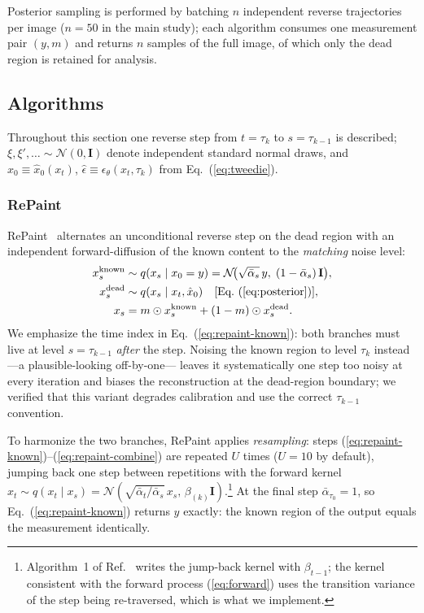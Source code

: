 Posterior sampling is performed by batching $n$ independent reverse
trajectories per image ($n = 50$ in the main study); each algorithm
consumes one measurement pair $(y, m)$ and returns $n$ samples of the
full image, of which only the dead region is retained for analysis.

\subsection{Algorithms}
\label{sec:inpainting:algorithms}

Throughout this section one reverse step from $t = \tau_k$ to
$s = \tau_{k-1}$ is described; $\xi, \xi', \dots \sim \mathcal{N}(0,
\mathbf{I})$ denote independent standard normal draws, and
$\hat x_0 \equiv \hat x_0(x_t)$, $\hat\epsilon \equiv
\epsilon_\theta(x_t, \tau_k)$ from Eq.~(\ref{eq:tweedie}).

\subsubsection{RePaint}
\label{sec:inpainting:repaint}

RePaint~\cite{lugmayr2022repaint} alternates an unconditional reverse
step on the dead region with an independent forward-diffusion of the
known content to the \emph{matching} noise level:
\begin{align}
  x_s^{\mathrm{known}} &\sim
      q(x_s \mid x_0 = y)
      = \mathcal{N}\!\bigl(\sqrt{\bar\alpha_s}\, y,\;
                           (1-\bar\alpha_s)\,\mathbf{I}\bigr),
  \label{eq:repaint-known}\\
  x_s^{\mathrm{dead}} &\sim
      q(x_s \mid x_t, \hat x_0)
      \quad\text{[Eq.~(\ref{eq:posterior})]},
  \label{eq:repaint-unknown}\\
  x_s &= m \odot x_s^{\mathrm{known}}
        + (1-m) \odot x_s^{\mathrm{dead}} .
  \label{eq:repaint-combine}
\end{align}
We emphasize the time index in Eq.~(\ref{eq:repaint-known}): both branches
must live at level $s = \tau_{k-1}$ \emph{after} the step.  Noising the
known region to level $\tau_k$ instead---a plausible-looking off-by-one---
leaves it systematically one step too noisy at every iteration and biases
the reconstruction at the dead-region boundary; we verified that this
variant degrades calibration and use the correct $\tau_{k-1}$ convention.

To harmonize the two branches, RePaint applies \emph{resampling}: steps
(\ref{eq:repaint-known})--(\ref{eq:repaint-combine}) are repeated $U$
times ($U = 10$ by default), jumping back one step between repetitions
with the forward kernel
$x_t \sim q(x_t \mid x_s) = \mathcal{N}(\sqrt{\bar\alpha_t/\bar\alpha_s}\,
x_s,\, \beta_{(k)}\mathbf{I})$.\footnote{Algorithm~1 of
Ref.~\cite{lugmayr2022repaint} writes the jump-back kernel with
$\beta_{t-1}$; the kernel consistent with the forward process
(\ref{eq:forward}) uses the transition variance of the step being
re-traversed, which is what we implement.}
At the final step $\bar\alpha_{\tau_0} = 1$, so
Eq.~(\ref{eq:repaint-known}) returns $y$ exactly: the known region of the
output equals the measurement identically.

